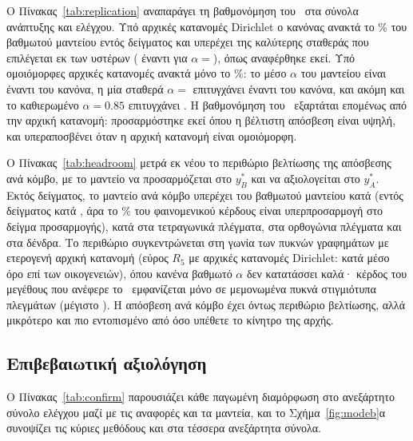 \documentclass[11pt,a4paper]{article}
\theoremstyle{definition}
\theoremstyle{plain}
\begin{document}
Ο Πίνακας~\ref{tab:replication} αναπαράγει τη βαθμονόμηση του~\cite{konstantellos26} στα σύνολα ανάπτυξης και ελέγχου. Υπό αρχικές κατανομές Dirichlet ο κανόνας ανακτά το \RepPctDir\% του βαθμωτού μαντείου εντός δείγματος και υπερέχει της καλύτερης σταθεράς που επιλέγεται εκ των υστέρων (\RepRuleDir{} έναντι \RepBestConstDir{} για $\alpha={}$\RepBestConstAlphaDir{}), όπως αναφέρθηκε εκεί. Υπό ομοιόμορφες αρχικές κατανομές ανακτά μόνο το \RepPctUnif\%: το μέσο $\alpha$ του μαντείου είναι \RepOracleAlphaUnif{} έναντι \RepRuleAlpha{} του κανόνα, η μία σταθερά $\alpha={}$\RepConstAlphaUnif{} επιτυγχάνει \RepConstUnif{} έναντι \RepRuleUnif{} του κανόνα, και ακόμη και το καθιερωμένο $\alpha=0.85$ επιτυγχάνει \RepFixedUnif. Η βαθμονόμηση του~\cite{konstantellos26} εξαρτάται επομένως από την αρχική κατανομή: προσαρμόστηκε εκεί όπου η βέλτιστη απόσβεση είναι υψηλή, και υπεραποσβένει όταν η αρχική κατανομή είναι ομοιόμορφη.

\TabReplication

Ο Πίνακας~\ref{tab:headroom} μετρά εκ νέου το περιθώριο βελτίωσης της απόσβεσης ανά κόμβο, με το μαντείο να προσαρμόζεται στο $y^*_B$ και να αξιολογείται στο $y^*_A$. Εκτός δείγματος, το μαντείο ανά κόμβο υπερέχει του βαθμωτού μαντείου κατά \HeadAll{} (εντός δείγματος κατά \HeadApparent, άρα το \HeadOverfitPct\% του φαινομενικού κέρδους είναι υπερπροσαρμογή στο δείγμα προσαρμογής), κατά \HeadGrid{} στα τετραγωνικά πλέγματα, \HeadRect{} στα ορθογώνια πλέγματα και \HeadTree{} στα δένδρα. Το περιθώριο συγκεντρώνεται στη γωνία των πυκνών γραφημάτων με ετερογενή αρχική κατανομή (εύρος $R_5$ με αρχικές κατανομές Dirichlet: \HeadCorner{} κατά μέσο όρο επί των οικογενειών), όπου κανένα βαθμωτό $\alpha$ δεν κατατάσσει καλά· κέρδος του μεγέθους που ανέφερε το~\cite{konstantellos26} εμφανίζεται μόνο σε μεμονωμένα πυκνά στιγμιότυπα πλεγμάτων (μέγιστο \HeadMax). Η απόσβεση ανά κόμβο έχει όντως περιθώριο βελτίωσης, αλλά μικρότερο και πιο εντοπισμένο από όσο υπέθετε το κίνητρο της αρχής.

\TabHeadroom

\subsection{Επιβεβαιωτική αξιολόγηση}\label{sec:confirm}

Ο Πίνακας~\ref{tab:confirm} παρουσιάζει κάθε παγωμένη διαμόρφωση στο ανεξάρτητο σύνολο ελέγχου μαζί με τις αναφορές και τα μαντεία, και το Σχήμα~\ref{fig:modeb}α συνοψίζει τις κύριες μεθόδους και στα τέσσερα ανεξάρτητα σύνολα.
\end{document}
